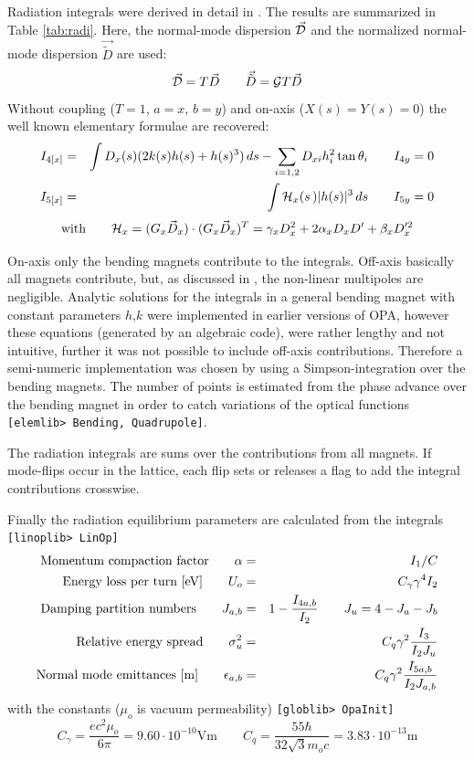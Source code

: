 \documentclass[12pt]{article}
\newcommand\beq{\begin{equation}}
\newcommand\eeq{\end{equation}}
\newcommand{\tilvec}[1]{\vec{\tilde{#1}}}
\newcommand\code[1]{{\tt [#1]}}
\begin{document}
Radiation integrals were derived in detail in \cite{VZAS}. The results are summarized in Table \ref{tab:radi}. Here, the normal-mode dispersion $\vec{\cal D}$ and the normalized normal-mode dispersion $\tilvec{D}$ are used:
\begin{equation}\label{eq:nmodedisp}
\vec{\cal D} =  T\vec{D}\qquad \tilvec{D}= {\cal G} T \vec D
\end{equation}
Without coupling ($T=1$, $a=x$, $b=y$) and on-axis ($X(s)=Y(s)=0$) the well known elementary formulae are recovered:
\begin{eqnarray*}
I_{4[x]} & = &  \int D_x(s) (2k(s)h(s)+h(s)^3)\,ds - \sum_{i=1,2} D_{xi} h_i^2 \tan \theta_i\qquad I_{4y}=0 \\
I_{5[x]} & = & \int {\cal H}_x(s\,)|h(s)|^3 \, ds \qquad I_{5y}=0
\end{eqnarray*}
\[
\mbox{\rm with} \qquad  {\cal H}_x =(G_x \vec{D}_x) \cdot (G_x \vec{D}_x)^T = \gamma_xD_x^2 + 2\alpha_x D_xD' + \beta_xD_x'^2
\]

On-axis only the bending magnets contribute to the integrals. Off-axis basically all magnets contribute, but, as discussed in \cite{VZAS}, the non-linear multipoles are negligible.
Analytic solutions for the integrals in a general bending magnet with constant parameters $h$,$k$ were implemented in earlier versions of OPA, however these equations (generated by an algebraic code), were rather lengthy and not intuitive, further it was not possible to include off-axis contributions. Therefore a semi-numeric implementation was chosen by using a Simpson-integration over the bending magnets. The number of points is estimated from the phase advance over the bending magnet in order to catch variations of the optical functions \code{elemlib> Bending, Quadrupole}.

The radiation integrals are sums over the contributions from all magnets. If mode-flips occur in the lattice, each flip sets or releases a flag to add the integral contributions crosswise.

Finally the radiation equilibrium parameters are calculated from the integrals \code{linoplib> LinOp}
\begin{eqnarray}
\mbox{\rm Momentum compaction factor}   \qquad \alpha & = & I_1/C \\
\mbox{\rm Energy loss per turn [eV]}  \qquad  U_o & = &  C_{\gamma} \gamma^4 I_2 \\
\mbox{\rm Damping partition numbers}  \qquad J_{a,b} & = &  1-\frac{I_{4a,b}}{I_2}\qquad J_u=4-J_a-J_b \\
\mbox{\rm Relative energy spread}  \qquad \sigma_u^2 & = &  C_q\gamma^2\frac{I_3}{I_2 J_u} \\
\mbox{\rm Normal mode emittances [m]}  \qquad \epsilon_{a,b} & = & C_q\gamma^2\frac{I_{5a,b}}{I_2 J_{a,b}}
\end{eqnarray}
with the constants ($\mu_o$ is vacuum permeability) \code{globlib> OpaInit}
\beq
C_{\gamma}= \frac{ec^2\mu_o}{6\pi} = 9.60\cdot10^{-10} \mbox{Vm} \qquad
C_q = \frac{55 \hbar}{32 \sqrt{3} m_oc} =3.83\cdot10^{-13} \mbox{m}
\eeq
\end{document}
